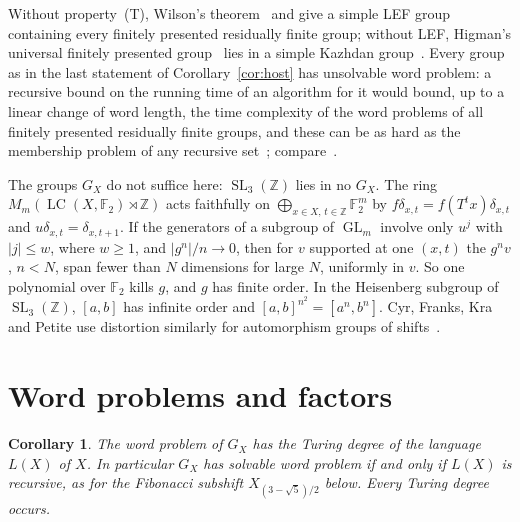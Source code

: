 \documentclass[11pt]{amsart}
\newtheorem{corollary}[theorem]{Corollary}
\newcommand{\F}{\mathbb F}
\newcommand{\Z}{\mathbb Z}
\newcommand{\LC}{\operatorname{LC}}
\newcommand{\GL}{\operatorname{GL}}
\newcommand{\SL}{\operatorname{SL}}
\begin{document}
Without property~\textup{(T)}, Wilson's theorem~\cite{Wilson} and
\cite[Theorem~1.2]{KionkeSchesler} give a simple LEF group containing
every finitely presented residually finite group; without LEF, Higman's
universal finitely presented group~\cite{Higman} lies in a simple Kazhdan
group~\cite[Theorem~1.5]{CoulonFournierFacio}. Every group as in the last
statement of Corollary~\ref{cor:host} has unsolvable word problem: a
recursive bound on the running time of an algorithm for it would bound,
up to a linear change of word length, the time complexity of the word
problems of all finitely presented residually finite groups, and these
can be as hard as the membership problem of any recursive
set~\cite[Theorem~4.21]{KMS}; compare~\cite[Proposition~26 and the proof of
Lemma~27]{Rauzy}.

The groups $G_X$ do not suffice here: $\SL_3(\Z)$ lies in no $G_X$. The
ring $M_m(\LC(X,\F_2)\rtimes\Z)$ acts faithfully on
$\bigoplus_{x\in X,\,t\in\Z}\F_2^m$ by $f\delta_{x,t}=f(T^tx)\delta_{x,t}$
and $u\delta_{x,t}=\delta_{x,t+1}$. If the generators of a subgroup of
$\GL_m$ involve only $u^j$ with $|j|\le w$, where $w\ge1$, and
$|g^n|/n\to0$, then for $v$ supported at one $(x,t)$ the $g^nv$, $n<N$,
span fewer than $N$ dimensions for large $N$, uniformly in $v$. So one
polynomial over $\F_2$ kills $g$, and $g$ has finite order. In the
Heisenberg subgroup of $\SL_3(\Z)$, $[a,b]$ has infinite order and
$[a,b]^{n^2}=[a^n,b^n]$. Cyr, Franks, Kra and Petite use distortion
similarly for automorphism groups of shifts~\cite{CFKP}.

\section{Word problems and factors}\label{sec:wp}

\begin{corollary}\label{cor:wp}
The word problem of $G_X$ has the Turing degree of the language $L(X)$
of $X$. In particular $G_X$ has solvable word problem if and only if
$L(X)$ is recursive, as for the Fibonacci subshift $X_{(3-\sqrt5)/2}$
below. Every Turing degree occurs.
\end{corollary}
\end{document}
